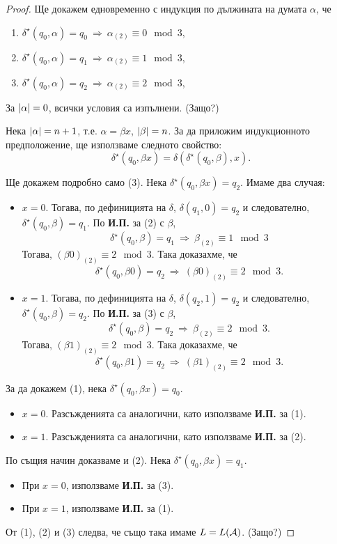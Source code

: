 \begin{proof}
  Ще докажем едновременно с индукция по дължината на думата $\alpha$, че
  \begin{enumerate}[(1)]
  \item 
    $\delta^\star(q_0,\alpha) = q_0\ \Rightarrow\ \alpha_{(2)} \equiv 0 \mod 3$,
  \item 
    $\delta^\star(q_0,\alpha) = q_1\ \Rightarrow\ \alpha_{(2)} \equiv 1 \mod 3$,
  \item 
    $\delta^\star(q_0,\alpha) = q_2\ \Rightarrow\ \alpha_{(2)} \equiv 2 \mod 3$,
  \end{enumerate}
  
  За $\vert{\alpha}\vert = 0$, всички условия са изпълнени. (Защо?)
  
  Нека $\vert{\alpha}\vert = n+1$, т.е. $\alpha = \beta x$, $\vert{\beta}\vert = n$.
  За да приложим индукционното предположение, ще използваме следното свойство:
  \[\delta^\star(q_0,\beta x) = \delta(\delta^\star(q_0,\beta),x).\]
  
  Ще докажем подробно само (3).
  Нека $\delta^\star(q_0,\beta x) = q_2$. 
  Имаме два случая:
  \begin{itemize}
  \item 
    $x = 0$. 
    Тогава, по дефиницията на $\delta$, 
    $\delta(q_1,0) = q_2$ и следователно, $\delta^\star(q_0,\beta) = q_1$.
    По {\bf И.П.} за (2) с $\beta$,
    \[\delta^\star(q_0,\beta) = q_1\ \Rightarrow\ \beta_{(2)} \equiv 1 \mod 3\]
    Тогава, $(\beta0)_{(2)} \equiv 2 \mod 3$. Така доказахме, че
    \[\delta^\star(q_0,\beta 0) = q_2\ \Rightarrow\ (\beta 0)_{(2)} \equiv 2 \mod 3.\]
  \item
    $x = 1$.
    Тогава, по дефиницията на $\delta$, $\delta(q_2,1) = q_2$ и следователно,
    $\delta^\star(q_0,\beta) = q_2$.
    По {\bf И.П.} за (3) с $\beta$,
    \[\delta^\star(q_0,\beta) = q_2\ \Rightarrow\ \beta_{(2)} \equiv 2 \mod 3.\]
    Тогава, $(\beta1)_{(2)} \equiv 2 \mod 3$. Така доказахме, че
    \[\delta^\star(q_0,\beta 1) = q_2\ \Rightarrow\ (\beta 1)_{(2)} \equiv 2 \mod 3.\]
  \end{itemize}
  
  За да докажем (1), нека $\delta^\star(q_0,\beta x) = q_0$. 
  \begin{itemize}
  \item 
    $x = 0$. Разсъжденията са аналогични, като използваме {\bf И.П.} за (1).
  \item
    $x = 1$. Разсъжденията са аналогични, като използваме {\bf И.П.} за (2).
  \end{itemize}
  
  По същия начин доказваме и (2). Нека $\delta^\star(q_0,\beta x) = q_1$. 
  \begin{itemize}
  \item 
    При $x = 0$, използваме {\bf И.П.} за (3).
  \item
    При $x = 1$, използваме {\bf И.П.} за (1).
  \end{itemize}

  От (1), (2) и (3) следва, че също така имаме $L = L(\mathcal{A})$. (Защо?)
\end{proof}

